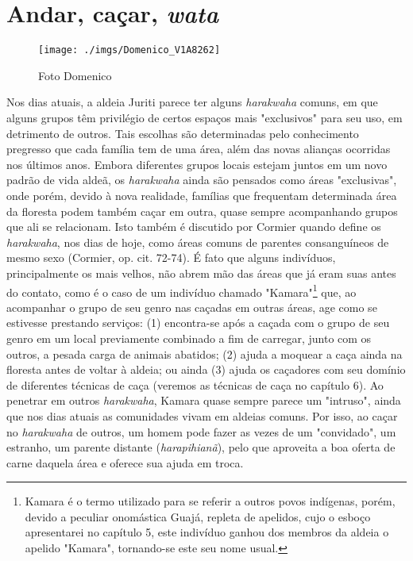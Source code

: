 \section{Andar, caçar, \emph{wata}}

\begin{figure}[H]
\centering
  \texttt{[image: ./imgs/Domenico\_V1A8262]}
\caption{Foto Domenico}
\end{figure}

Nos dias atuais, a aldeia Juriti parece ter alguns \emph{harakwaha}
comuns, em que alguns grupos têm privilégio de certos espaços mais
"exclusivos" para seu uso, em detrimento de outros. Tais escolhas são
determinadas pelo conhecimento pregresso que cada família tem de uma
área, além das novas alianças ocorridas nos últimos anos. Embora
diferentes grupos locais estejam juntos em um novo padrão de vida aldeã,
os \emph{harakwaha} ainda são pensados como áreas "exclusivas", onde
porém, devido à nova realidade, famílias que frequentam determinada área
da floresta podem também caçar em outra, quase sempre acompanhando
grupos que ali se relacionam. Isto também é discutido por Cormier quando
define os \emph{harakwaha}, nos dias de hoje, como áreas comuns de
parentes consanguíneos de mesmo sexo (Cormier, op. cit. 72-74). É fato
que alguns indivíduos, principalmente os mais velhos, não abrem mão das
áreas que já eram suas antes do contato, como é o caso de um indivíduo
chamado "Kamara"\footnote{Kamara é o termo utilizado para se referir a
  outros povos indígenas, porém, devido a peculiar onomástica Guajá,
  repleta de apelidos, cujo o esboço apresentarei no capítulo 5, este
  indivíduo ganhou dos membros da aldeia o apelido "Kamara", tornando-se
  este seu nome usual.} que, ao acompanhar o grupo de seu genro nas
caçadas em outras áreas, age como se estivesse prestando serviços: (1)
encontra-se após a caçada com o grupo de seu genro em um local
previamente combinado a fim de carregar, junto com os outros, a pesada
carga de animais abatidos; (2) ajuda a moquear a caça ainda na floresta
antes de voltar à aldeia; ou ainda (3) ajuda os caçadores com seu
domínio de diferentes técnicas de caça (veremos as técnicas de caça no
capítulo 6). Ao penetrar em outros \emph{harakwaha}, Kamara quase sempre
parece um "intruso", ainda que nos dias atuais as comunidades vivam em
aldeias comuns. Por isso, ao caçar no \emph{harakwaha} de outros, um
homem pode fazer as vezes de um "convidado", um estranho, um parente
distante (\emph{harapihianã}), pelo que aproveita a boa oferta de carne
daquela área e oferece sua ajuda em troca.

